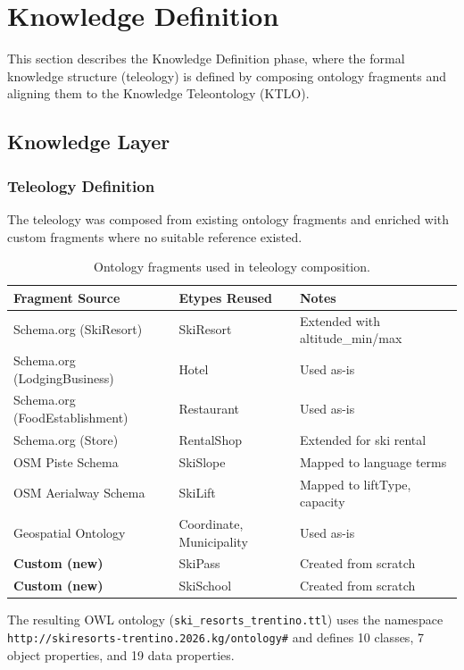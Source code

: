 \section{Knowledge Definition}

This section describes the Knowledge Definition phase, where the formal knowledge structure (teleology) is defined by composing ontology fragments and aligning them to the Knowledge Teleontology (KTLO).

\subsection{Knowledge Layer}

\subsubsection{Teleology Definition}

The teleology was composed from existing ontology fragments and enriched with custom fragments where no suitable reference existed.

\begin{table}[h!]
\centering
\small
\begin{tabular}{|l|l|l|}
\hline
\textbf{Fragment Source} & \textbf{Etypes Reused} & \textbf{Notes} \\
\hline
Schema.org (SkiResort) & SkiResort & Extended with altitude\_min/max \\
Schema.org (LodgingBusiness) & Hotel & Used as-is \\
Schema.org (FoodEstablishment) & Restaurant & Used as-is \\
Schema.org (Store) & RentalShop & Extended for ski rental \\
OSM Piste Schema & SkiSlope & Mapped to language terms \\
OSM Aerialway Schema & SkiLift & Mapped to liftType, capacity \\
Geospatial Ontology & Coordinate, Municipality & Used as-is \\
\textbf{Custom (new)} & SkiPass & Created from scratch \\
\textbf{Custom (new)} & SkiSchool & Created from scratch \\
\hline
\end{tabular}
\caption{Ontology fragments used in teleology composition.}
\end{table}

\noindent The resulting OWL ontology (\texttt{ski\_resorts\_trentino.ttl}) uses the namespace \texttt{http://skiresorts-trentino.2026.kg/ontology\#} and defines 10 classes, 7 object properties, and 19 data properties.

